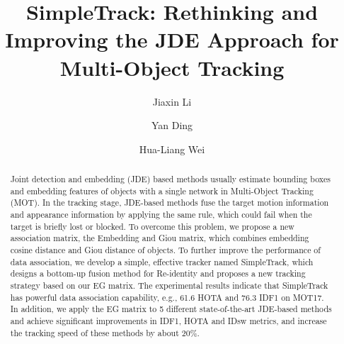 \documentclass[runningheads]{llncs}
\begin{document}
\pagestyle{headings}
\mainmatter



\title{SimpleTrack: Rethinking and Improving the JDE Approach for Multi-Object Tracking} 
\renewcommand{\thefootnote}{0}
\author{Jiaxin Li \and
Yan Ding \and
Hua-Liang Wei}
\maketitle
\begin{abstract}
Joint detection and embedding (JDE) based methods usually estimate bounding boxes and embedding features of objects with a single network in Multi-Object Tracking (MOT). In the tracking stage, JDE-based methods fuse the target motion information and appearance information by applying the same rule, which could fail when the target is briefly lost or blocked. To overcome this problem, we propose a new association matrix, the Embedding and Giou matrix, which combines embedding cosine distance and Giou distance of objects. To further improve the performance of data association, we develop a simple, effective tracker named SimpleTrack, which designs a bottom-up fusion method for Re-identity and proposes a new tracking strategy based on our EG matrix. The experimental results indicate that SimpleTrack has powerful data association capability, e.g., 61.6 HOTA and 76.3 IDF1 on MOT17. In addition, we apply the EG matrix to 5 different state-of-the-art JDE-based methods and achieve significant improvements in IDF1, HOTA and IDsw metrics, and increase the tracking speed of these methods by about 20\%. 

\end{abstract}
\end{document}
